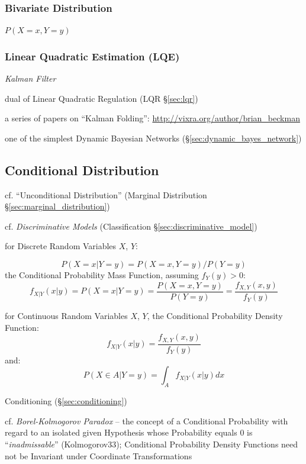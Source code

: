 \subsubsection{Bivariate Distribution}\label{sec:bivariate_distribution}

$P(X = x, Y = y)$



\subsubsection{Linear Quadratic Estimation (LQE)}\label{sec:lqe}

\emph{Kalman Filter}

dual of Linear Quadratic Regulation (LQR \S\ref{sec:lqr})

a series of papers on ``Kalman Folding'':
\url{http://vixra.org/author/brian_beckman}

one of the simplest Dynamic Bayesian Networks
(\S\ref{sec:dynamic_bayes_network})



\subsection{Conditional Distribution}\label{sec:conditional_distribution}

cf. ``Unconditional Distribution'' (Marginal Distribution
\S\ref{sec:marginal_distribution})

cf. \emph{Discriminative Models} (Classification
\S\ref{sec:discriminative_model})

for Discrete Random Variables $X$, $Y$:

\[
  P(X = x | Y = y) = P(X = x, Y = y)/P(Y = y)
\]
the Conditional Probability Mass Function, assuming $f_Y(y) > 0$:
\[
  f_{X|Y}(x|y) = P(X = x|Y = y) =
    \frac{P(X = x, Y = y)}{P(Y = y)} =
    \frac{f_{X,Y}(x,y)}{f_Y(y)}
\]

for Continuous Random Variables $X$, $Y$, the Conditional Probability Density
Function:
\[
  f_{X|Y}(x|y) = \frac{f_{X,Y}(x,y)}{f_Y(y)}
\]
and:
\[
  P(X \in A| Y = y) = \int_A f_{X|Y}(x|y) dx
\]

\fist Conditioning (\S\ref{sec:conditioning})

cf. \emph{Borel-Kolmogorov Paradox} -- the concept of a Conditional Probability
with regard to an isolated given Hypothesis whose Probability equals $0$ is
``\emph{inadmissable}'' (Kolmogorov33); Conditional Probability Density
Functions need not be Invariant under Coordinate Transformations



